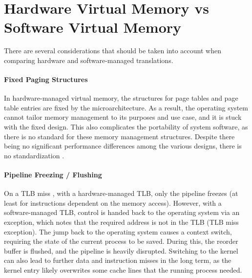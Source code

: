 \section{Hardware Virtual Memory vs Software Virtual Memory}

There are several considerations that should be taken into account when comparing hardware and
software-managed translations.

\paragraph{Fixed Paging Structures} In hardware-managed virtual memory, the structures for page tables
and page table entries are fixed by the microarchitecture. As a result, the operating system cannot tailor
memory management to its purposes and use case, and it is stuck with the fixed design.
This also complicates the portability of system software, as there is no standard for these memory management
structures. Despite there being no significant performance differences among the various designs,
there is no standardization \cite{jacob1998look}.

\paragraph{Pipeline Freezing / Flushing} On a TLB miss ,
with a hardware-managed TLB, only the pipeline freezes (at least for instructions dependent on
the memory access). However, with a software-managed TLB, control is handed back to the operating system
via an exception, which notes that the required address is not in the TLB (TLB miss exception).
The jump back to the operating system causes a context switch, requiring the state of the current process
to be saved. During this, the reorder buffer is flushed, and the pipeline is heavily disrupted.
Switching to the kernel can also lead to further data and instruction misses in the long term,
as the kernel entry likely overwrites some cache lines that the running process needed. 

